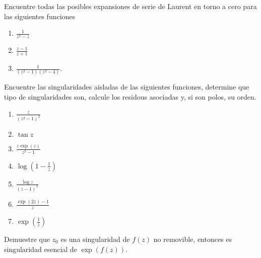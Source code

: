 \documentclass{homework}
\begin{document}
\begin{prob}
    Encuentre todas las posibles expansiones de serie de Laurent en torno a cero para las siguientes funciones
    \begin{enumerate}
        \item \(\frac1{z^2-z}\)
        \item \(\frac{z-1}{z+1}\)
        \item \(\frac1{(z^2-1)(z^2-4)}\).
    \end{enumerate}
\end{prob}

\begin{sol}
    
\end{sol}

\begin{prob}
    Encuentre las singularidades aisladas de las siguientes funciones, determine que tipo de singularidades son, calcule los residous asociadas y, si son polos, su orden.
    \begin{multicols}{2}
        \begin{enumerate}
            \item \(\frac{z}{(z^2-1)^2}\)
            \item \(\tan z\)
            \item \(\frac{z\exp(z)}{z^2-1}\)
            \item \(\log(1-\frac1z)\)
            \item \(\frac{\log z}{(z-1)^3}\)
            \item \(\frac{\exp(2z)-1}z\)
            \item \(\exp(\frac1z)\)
        \end{enumerate}
    \end{multicols}
\end{prob}

\begin{sol}
    
\end{sol}

\begin{prob}
    Demuestre que \(z_0\) es una singularidad de \(f(z)\) no removible, entonces es singularidad esencial de \(\exp(f(z))\).
\end{prob}
\end{document}
